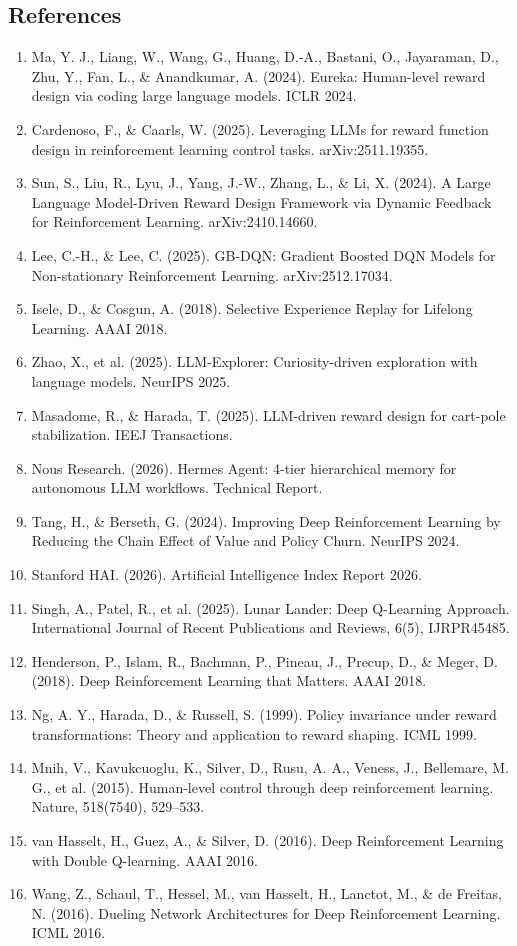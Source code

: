 \subsection{References}\label{references}

\begin{enumerate}
\def\labelenumi{\arabic{enumi}.}
\tightlist
\item
  Ma, Y. J., Liang, W., Wang, G., Huang, D.-A., Bastani, O., Jayaraman, D., Zhu, Y., Fan, L., \& Anandkumar, A. (2024). Eureka: Human-level reward design via coding large language models. ICLR 2024.
\item
  Cardenoso, F., \& Caarls, W. (2025). Leveraging LLMs for reward function design in reinforcement learning control tasks. arXiv:2511.19355.
\item
  Sun, S., Liu, R., Lyu, J., Yang, J.-W., Zhang, L., \& Li, X. (2024). A Large Language Model-Driven Reward Design Framework via Dynamic Feedback for Reinforcement Learning. arXiv:2410.14660.
\item
  Lee, C.-H., \& Lee, C. (2025). GB-DQN: Gradient Boosted DQN Models for Non-stationary Reinforcement Learning. arXiv:2512.17034.
\item
  Isele, D., \& Cosgun, A. (2018). Selective Experience Replay for Lifelong Learning. AAAI 2018.
\item
  Zhao, X., et al. (2025). LLM-Explorer: Curiosity-driven exploration with language models. NeurIPS 2025.
\item
  Masadome, R., \& Harada, T. (2025). LLM-driven reward design for cart-pole stabilization. IEEJ Transactions.
\item
  Nous Research. (2026). Hermes Agent: 4-tier hierarchical memory for autonomous LLM workflows. Technical Report.
\item
  Tang, H., \& Berseth, G. (2024). Improving Deep Reinforcement Learning by Reducing the Chain Effect of Value and Policy Churn. NeurIPS 2024.
\item
  Stanford HAI. (2026). Artificial Intelligence Index Report 2026.
\item
  Singh, A., Patel, R., et al. (2025). Lunar Lander: Deep Q-Learning Approach. International Journal of Recent Publications and Reviews, 6(5), IJRPR45485.
\item
  Henderson, P., Islam, R., Bachman, P., Pineau, J., Precup, D., \& Meger, D. (2018). Deep Reinforcement Learning that Matters. AAAI 2018.
\item
  Ng, A. Y., Harada, D., \& Russell, S. (1999). Policy invariance under reward transformations: Theory and application to reward shaping. ICML 1999.
\item
  Mnih, V., Kavukcuoglu, K., Silver, D., Rusu, A. A., Veness, J., Bellemare, M. G., et al. (2015). Human-level control through deep reinforcement learning. Nature, 518(7540), 529--533.
\item
  van Hasselt, H., Guez, A., \& Silver, D. (2016). Deep Reinforcement Learning with Double Q-learning. AAAI 2016.
\item
  Wang, Z., Schaul, T., Hessel, M., van Hasselt, H., Lanctot, M., \& de Freitas, N. (2016). Dueling Network Architectures for Deep Reinforcement Learning. ICML 2016.
\end{enumerate}

